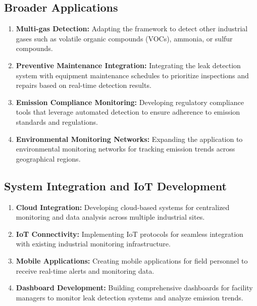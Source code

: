 \subsection{Broader Applications}

\begin{enumerate}
\item \textbf{Multi-gas Detection:} Adapting the framework to detect other industrial gases such as volatile organic compounds (VOCs), ammonia, or sulfur compounds.

\item \textbf{Preventive Maintenance Integration:} Integrating the leak detection system with equipment maintenance schedules to prioritize inspections and repairs based on real-time detection results.

\item \textbf{Emission Compliance Monitoring:} Developing regulatory compliance tools that leverage automated detection to ensure adherence to emission standards and regulations.

\item \textbf{Environmental Monitoring Networks:} Expanding the application to environmental monitoring networks for tracking emission trends across geographical regions.
\end{enumerate}

\subsection{System Integration and IoT Development}

\begin{enumerate}
\item \textbf{Cloud Integration:} Developing cloud-based systems for centralized monitoring and data analysis across multiple industrial sites.

\item \textbf{IoT Connectivity:} Implementing IoT protocols for seamless integration with existing industrial monitoring infrastructure.

\item \textbf{Mobile Applications:} Creating mobile applications for field personnel to receive real-time alerts and monitoring data.

\item \textbf{Dashboard Development:} Building comprehensive dashboards for facility managers to monitor leak detection systems and analyze emission trends.
\end{enumerate}

